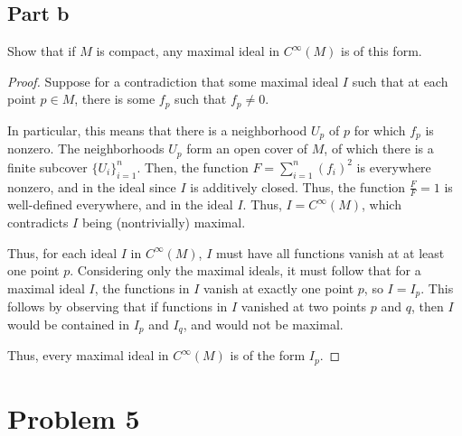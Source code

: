 \documentclass[fontsize=11pt]{scrartcl} %
\numberwithin{equation}{section} %
\numberwithin{figure}{section} %
\numberwithin{table}{section} %
\begin{document}
\subsection*{Part b}
Show that if $M$ is compact, any maximal ideal in $C^{\infty}(M)$ is of this
form.
\\
\begin{proof}
Suppose for a contradiction that some maximal ideal $I$ such that at each point
$p\in M$, there is some $f_p$ such that $f_p\neq 0$.

In particular, this means that there is a neighborhood $U_p$ of $p$ for which
    $f_p$ is nonzero. The neighborhoods $U_p$ form an open cover of $M$, of
    which there is a finite subcover $\{U_i\}_{i=1}^n$. Then, the function
    $F = \sum_{i=1}^n(f_i)^2$ is everywhere nonzero, and in the ideal since $I$ is
    additively closed. Thus, the function $\frac{F}{F}=1$ is well-defined
    everywhere, and in the ideal $I$. Thus, $I=C^{\infty}(M)$, which contradicts
    $I$ being (nontrivially) maximal.

    Thus, for each ideal $I$ in $C^{\infty}(M)$, $I$ must have all functions
    vanish at at least one point $p$. Considering only the maximal ideals, it
    must follow that for a maximal ideal $I$, the functions in $I$ vanish at
    exactly one point $p$, so $I=I_p$. This follows by observing that if
    functions in $I$ vanished at two points $p$ and $q$, then $I$ would be
    contained in $I_p$ and $I_q$, and would not be maximal.

    Thus, every maximal ideal in $C^{\infty}(M)$ is of the form $I_p$.
\end{proof}
\newpage
\section*{Problem 5}
\end{document}
